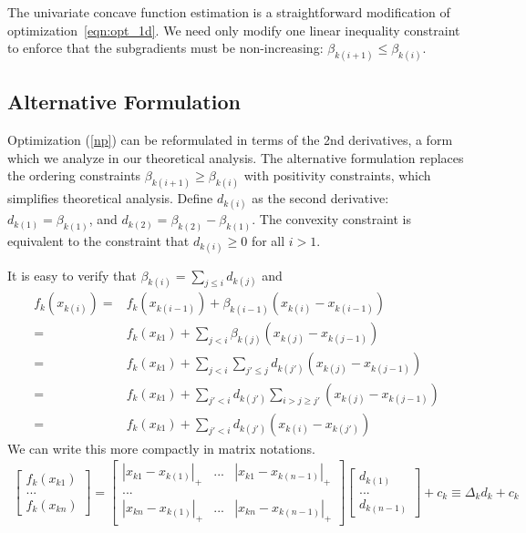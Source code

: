 The univariate concave function estimation is a straightforward modification of optimization~\ref{eqn:opt_1d}. We need only modify one linear inequality constraint to enforce that the subgradients must be non-increasing: $\beta_{k(i+1)} \leq \beta_{k(i)}$.


\subsection{Alternative Formulation}
Optimization (\ref{np}) can be reformulated in terms of the 2nd derivatives, a form which we analyze in our theoretical analysis. The alternative formulation replaces the ordering
constraints $\beta_{k(i+1)} \geq \beta_{k(i)}$ with positivity
constraints, which simplifies theoretical analysis.
Define $d_{k(i)}$ as the second derivative:
$d_{k(1)} = \beta_{k(1)}$, and $d_{k(2)} =
\beta_{k(2)} - \beta_{k(1)}$. The convexity constraint is
equivalent to the constraint that $d_{k(i)} \geq 0$ for all $i >
1$.

It is easy to verify that $\beta_{k(i)} = \sum_{j \leq i} d_{k(j)}$ and 
\begin{align*}
f_k(x_{k(i)}) = & f_k(x_{k(i-1)}) + \beta_{k(i-1)}(x_{k(i)} - x_{k(i-1)}) \\
 =& f_k(x_{k1}) + \sum_{j < i} \beta_{k(j)} (x_{k(j)} - x_{k(j-1)}) \\
 =& f_k(x_{k1}) + \sum_{j < i} \sum_{j' \leq j} d_{k(j')} (x_{k(j)} - x_{k(j-1)})\\
 =& f_k(x_{k1}) + \sum_{j' < i} d_{k(j')} \sum_{i > j \geq j'} (x_{k(j)} - x_{k(j-1)}) \\
 =& f_k(x_{k1}) + \sum_{j' < i} d_{k(j')} (x_{k(i)} - x_{k(j')})
\end{align*}
We can write this more compactly in matrix notations.
\begin{equation*}
\begin{split}
\left[ \begin{array}{c}
f_k(x_{k1}) \\
... \\
f_k(x_{kn}) 
\end{array} \right] =
\left[ \begin{array}{ccc}
    |x_{k1} - x_{k(1)}|_+ & ... & |x_{k1} - x_{k(n-1)}|_+ \\
    ... & & \\
    |x_{kn} - x_{k(1)}|_+ & ... & |x_{kn} - x_{k(n-1)}|_+ 
\end{array} \right]
\left[ \begin{array}{c}
    d_{k(1)} \\
    ... \\
    d_{k(n-1)}
\end{array} \right] 
+ c_k \equiv \Delta_k d_k + c_k
\end{split}
\end{equation*}


